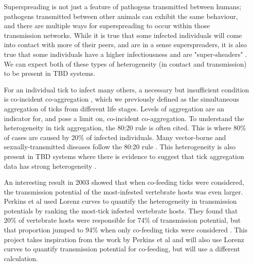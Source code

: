\documentclass{article}
\begin{document}
Superspreading is not just a feature of pathogens transmitted between humans; pathogens transmitted between other animals can exhibit the same behaviour, and there are multiple ways for superspreading to occur within those transmission networks. While it is true that some infected individuals will come into contact with more of their peers, and are in a sense superspreaders, it is also true that some individuals have a higher infectiousness and are "super-sheaders" \cite{VanderWaal_2016}. We can expect both of these types of heterogeneity (in contact and transmission) to be present in TBD systems.

For an individual tick to infect many others, a necessary but insufficient condition is co-incident co-aggregation \cite{Ferreri2014}, which we previously defined as the simultaneous aggregation of ticks from different life stages. Levels of aggregation are an indicator for, and pose a limit on, co-incident co-aggregation. To understand the heterogeneity in tick aggregation, the 80:20 rule is often cited. This is where 80\% of cases are caused by 20\% of infected individuals. Many vector-borne and sexually-transmitted diseases follow the 80:20 rule \cite{Woolhouse1997}. This heterogeneity is also present in TBD systems where there is evidence to suggest that tick aggregation data has strong heterogeneity \cite{Ferreri2014, Brunner2008, SHAW1998, DEVEVEY_2012}.

An interesting result in 2003 showed that when co-feeding ticks were considered, the transmission potential of the most-infested vertebrate hosts was even larger. Perkins et al used Lorenz curves to quantify the heterogeneity in transmission potentials by ranking the most-tick infested vertebrate hosts. They found that 20\% of vertebrate hosts were responsible for 74\% of transmission potential, but that proportion jumped to 94\% when only co-feeding ticks were considered \cite{Perkins_2003}. This project takes inspiration from the work by Perkins et al and will also use Lorenz curves to quantify transmission potential for co-feeding, but will use a different calculation.
\end{document}
